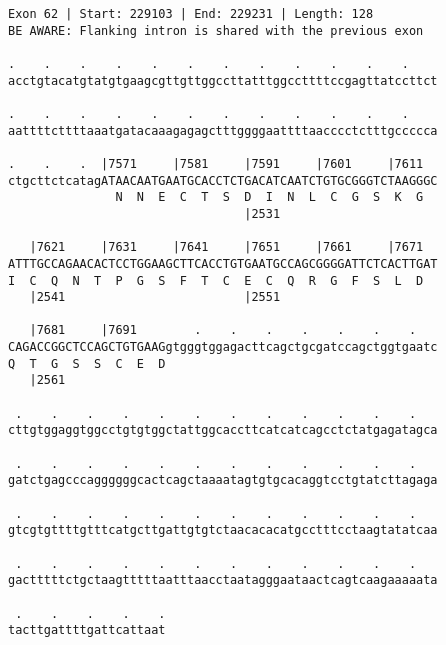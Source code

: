 \documentclass{article}
\begin{document}
\begin{Verbatim}[fontfamily=courier]
Exon 62 | Start: 229103 | End: 229231 | Length: 128
BE AWARE: Flanking intron is shared with the previous exon

.    .    .    .    .    .    .    .    .    .    .    .    
acctgtacatgtatgtgaagcgttgttggccttatttggccttttccgagttatccttct

.    .    .    .    .    .    .    .    .    .    .    .    
aattttcttttaaatgatacaaagagagctttggggaattttaacccctctttgccccca

.    .    .  |7571     |7581     |7591     |7601     |7611  
ctgcttctcatagATAACAATGAATGCACCTCTGACATCAATCTGTGCGGGTCTAAGGGC
               N  N  E  C  T  S  D  I  N  L  C  G  S  K  G  
                                 |2531                      

   |7621     |7631     |7641     |7651     |7661     |7671  
ATTTGCCAGAACACTCCTGGAAGCTTCACCTGTGAATGCCAGCGGGGATTCTCACTTGAT
I  C  Q  N  T  P  G  S  F  T  C  E  C  Q  R  G  F  S  L  D  
   |2541                         |2551                      

   |7681     |7691        .    .    .    .    .    .    .   
CAGACCGGCTCCAGCTGTGAAGgtgggtggagacttcagctgcgatccagctggtgaatc
Q  T  G  S  S  C  E  D                                      
   |2561                                                    

 .    .    .    .    .    .    .    .    .    .    .    .   
cttgtggaggtggcctgtgtggctattggcaccttcatcatcagcctctatgagatagca

 .    .    .    .    .    .    .    .    .    .    .    .   
gatctgagcccaggggggcactcagctaaaatagtgtgcacaggtcctgtatcttagaga

 .    .    .    .    .    .    .    .    .    .    .    .   
gtcgtgttttgtttcatgcttgattgtgtctaacacacatgcctttcctaagtatatcaa

 .    .    .    .    .    .    .    .    .    .    .    .   
gactttttctgctaagtttttaatttaacctaatagggaataactcagtcaagaaaaata

 .    .    .    .    .
tacttgattttgattcattaat
\end{Verbatim}
\newpage
\end{document}
